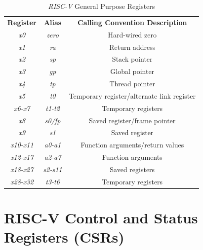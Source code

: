 \begin{table}
  \centering
  \begin{tabular}{|c|c|c|}
    \hline
    \textbf{Register}        & \textbf{Alias}  & \textbf{Calling Convention Description}    \\
    \hhline{===} \textit{x0} & \textit{zero}   & Hard-wired zero                            \\
    \hline
    \textit{x1}              & \textit{ra}     & Return address                             \\
    \hline
    \textit{x2}              & \textit{sp}     & Stack pointer                              \\
    \hline
    \textit{x3}              & \textit{gp}     & Global pointer                             \\
    \hline
    \textit{x4}              & \textit{tp}     & Thread pointer                             \\
    \hline
    \textit{x5}              & \textit{t0}     & Temporary register/alternate link register \\
    \hline
    \textit{x6-x7}           & \textit{t1-t2}  & Temporary registers                        \\
    \hline
    \textit{x8}              & \textit{s0/fp}  & Saved register/frame pointer               \\
    \hline
    \textit{x9}              & \textit{s1}     & Saved register                             \\
    \hline
    \textit{x10-x11}         & \textit{a0-a1}  & Function arguments/return values           \\
    \hline
    \textit{x12-x17}         & \textit{a2-a7}  & Function arguments                         \\
    \hline
    \textit{x18-x27}         & \textit{s2-s11} & Saved registers                            \\
    \hline
    \textit{x28-x32}         & \textit{t3-t6}  & Temporary registers                        \\
    \hline
  \end{tabular}
  \caption{\textit{RISC-V} General Purpose Registers}
  \label{tab:registers}
\end{table}

\section{RISC-V Control and Status Registers (CSRs)}
\label{sec:riscv_csrs}

